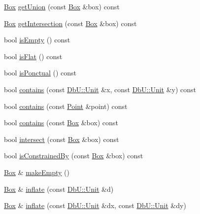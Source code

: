 \begin{DoxyCompactItemize}
\item 
\hyperlink{classHurricane_1_1Box}{Box} \hyperlink{classHurricane_1_1Box_a18bbae62e1bced57bb3cced8f014eb51}{get\-Union} (const \hyperlink{classHurricane_1_1Box}{Box} \&box) const 
\item 
\hyperlink{classHurricane_1_1Box}{Box} \hyperlink{classHurricane_1_1Box_aa276d0b59ce561f0935dbc8eec0be704}{get\-Intersection} (const \hyperlink{classHurricane_1_1Box}{Box} \&box) const 
\item 
bool \hyperlink{classHurricane_1_1Box_ac2cdfbd784237c2b47350eb4f643c4ef}{is\-Empty} () const 
\item 
bool \hyperlink{classHurricane_1_1Box_ae77e8f86586974a8e98a408666fc9222}{is\-Flat} () const 
\item 
bool \hyperlink{classHurricane_1_1Box_aed227b60e797540c81df21cdbd6ff9b1}{is\-Ponctual} () const 
\item 
bool \hyperlink{classHurricane_1_1Box_a978d2622d61acf8a52ee7dccc57f3944}{contains} (const \hyperlink{group__DbUGroup_ga4fbfa3e8c89347af76c9628ea06c4146}{Db\-U\-::\-Unit} \&x, const \hyperlink{group__DbUGroup_ga4fbfa3e8c89347af76c9628ea06c4146}{Db\-U\-::\-Unit} \&y) const 
\item 
bool \hyperlink{classHurricane_1_1Box_a00945472aee979a50bb30273fb797e16}{contains} (const \hyperlink{classHurricane_1_1Point}{Point} \&point) const 
\item 
bool \hyperlink{classHurricane_1_1Box_a91316e54654cd4531d45259386ec3e1b}{contains} (const \hyperlink{classHurricane_1_1Box}{Box} \&box) const 
\item 
bool \hyperlink{classHurricane_1_1Box_a0a6f9116c64f7a2ba7b25750df7e3ec1}{intersect} (const \hyperlink{classHurricane_1_1Box}{Box} \&box) const 
\item 
bool \hyperlink{classHurricane_1_1Box_a0bb62b00552380171939381d053f0555}{is\-Constrained\-By} (const \hyperlink{classHurricane_1_1Box}{Box} \&box) const 
\item 
\hyperlink{classHurricane_1_1Box}{Box} \& \hyperlink{classHurricane_1_1Box_a0717b1b105f65f8284c9b4e36df3a766}{make\-Empty} ()
\item 
\hyperlink{classHurricane_1_1Box}{Box} \& \hyperlink{classHurricane_1_1Box_a90207e7ca8044a6afc72674cc6ae366e}{inflate} (const \hyperlink{group__DbUGroup_ga4fbfa3e8c89347af76c9628ea06c4146}{Db\-U\-::\-Unit} \&d)
\item 
\hyperlink{classHurricane_1_1Box}{Box} \& \hyperlink{classHurricane_1_1Box_a6b97ea9d54fbf4dae52459073cdf4b5f}{inflate} (const \hyperlink{group__DbUGroup_ga4fbfa3e8c89347af76c9628ea06c4146}{Db\-U\-::\-Unit} \&dx, const \hyperlink{group__DbUGroup_ga4fbfa3e8c89347af76c9628ea06c4146}{Db\-U\-::\-Unit} \&dy)

\end{DoxyCompactItemize}
